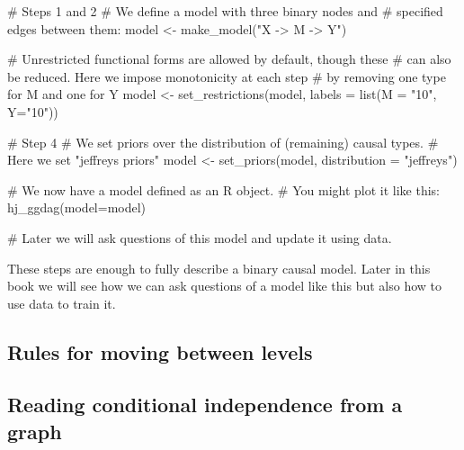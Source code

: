 \documentclass[
  12pt,
]{book}
\newenvironment{Shaded}{\begin{snugshade}}{\end{snugshade}}
\newcommand{\AttributeTok}[1]{\textcolor[rgb]{0.00,0.34,0.68}{#1}}
\newcommand{\CommentTok}[1]{\textcolor[rgb]{0.54,0.53,0.53}{#1}}
\newcommand{\FunctionTok}[1]{\textcolor[rgb]{0.39,0.29,0.61}{#1}}
\newcommand{\NormalTok}[1]{\textcolor[rgb]{0.12,0.11,0.11}{#1}}
\newcommand{\OtherTok}[1]{\textcolor[rgb]{0.00,0.43,0.16}{#1}}
\newcommand{\StringTok}[1]{\textcolor[rgb]{0.75,0.01,0.01}{#1}}
\begin{document}
\begin{Shaded}
\begin{Highlighting}[]
\CommentTok{\# Steps 1 and 2 }
\CommentTok{\# We define a model with three binary nodes and }
\CommentTok{\# specified edges between them:}
\NormalTok{model }\OtherTok{\textless{}{-}} \FunctionTok{make\_model}\NormalTok{(}\StringTok{"X {-}\textgreater{} M {-}\textgreater{} Y"}\NormalTok{)}

\CommentTok{\# Unrestricted functional forms are allowed by default, though these }
\CommentTok{\# can also be reduced. Here we impose monotonicity at each step }
\CommentTok{\# by removing one type for M and one for Y}
\NormalTok{model }\OtherTok{\textless{}{-}} \FunctionTok{set\_restrictions}\NormalTok{(model, }\AttributeTok{labels =} \FunctionTok{list}\NormalTok{(}\AttributeTok{M =} \StringTok{"10"}\NormalTok{, }\AttributeTok{Y=}\StringTok{"10"}\NormalTok{))}

\CommentTok{\# Step 4}
\CommentTok{\# We set priors over the distribution of (remaining) causal types.}
\CommentTok{\# Here we set "jeffreys priors"}
\NormalTok{model }\OtherTok{\textless{}{-}} \FunctionTok{set\_priors}\NormalTok{(model, }\AttributeTok{distribution =} \StringTok{"jeffreys"}\NormalTok{)}

\CommentTok{\# We now have a model defined as an R object. }
\CommentTok{\# You might plot it like this:}
\FunctionTok{hj\_ggdag}\NormalTok{(}\AttributeTok{model=}\NormalTok{model)}

\CommentTok{\# Later we will ask questions of this model and update it using data.}
\end{Highlighting}
\end{Shaded}

These steps are enough to fully describe a binary causal model. Later in this book we will see how we can ask questions of a model like this but also how to use data to train it.

\hypertarget{rules-for-moving-between-levels}{%
\subsection{Rules for moving between levels}\label{rules-for-moving-between-levels}}

\hypertarget{reading-conditional-independence-from-a-graph}{%
\subsection{Reading conditional independence from a graph}\label{reading-conditional-independence-from-a-graph}}
\end{document}
